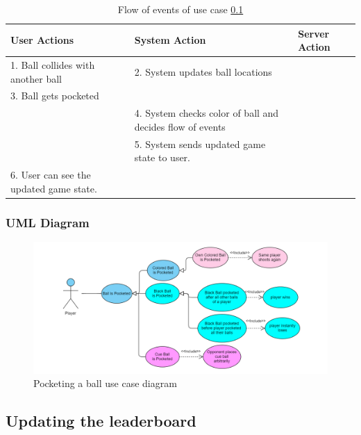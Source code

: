 \documentclass[10pt]{article}
\begin{document}
		\begin{table}[H]
		\label{eventFlow:pocketBall} 
			\begin{tabular}{|p{45mm}|p{45mm}|p{45mm}}
User Actions                                  & System Action                                & 
Server Action                                                              \\
\hline
1. Ball collides with another ball& 2. System updates ball locations           &                                                                            \\
                    3. Ball gets pocketed & &                                       \\
                                              &    4. System checks color of ball and decides flow of events &  \\
                                              & 5. System sends updated game state to user. &                                                                            \\6. User can see the updated game state.                &                                              &                                                                           
			\end{tabular}
		\caption{Flow of events of use case \ref{useCase:leaderboard}}
		\end{table}
		\subsubsection{UML Diagram}
		\begin{figure}[H]
			\includegraphics[width=\linewidth]{latex_images/pocketing_ball.png}
			\caption{Pocketing a ball use case diagram}
		\end{figure}
		
	\subsection{Updating the leaderboard}\label{useCase:leaderboard}
\end{document}
